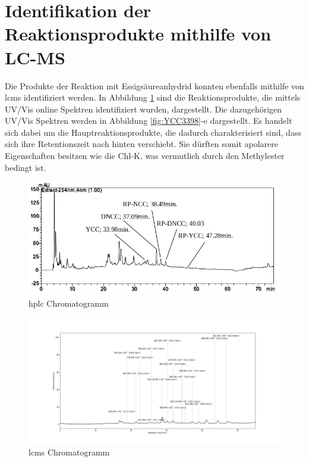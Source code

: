 \section{Identifikation der Reaktionsprodukte mithilfe von LC-MS}

Die Produkte der Reaktion mit Essigsäureanhydrid konnten ebenfalls mithilfe von \gls{lcms} identifiziert werden. In Abbildung \ref{fig:HPLCChromatogrammRP} sind die Reaktionsprodukte, die mittels UV/Vis online Spektren identifiziert wurden, dargestellt. Die dazugehörigen UV/Vis Spektren werden in Abbildung \ref{fig:YCC3398}-e dargestellt. Es handelt sich dabei um die Hauptreaktionsprodukte, die dadurch charakterisiert sind, dass sich ihre Retentionszeit nach hinten verschiebt. Sie dürften somit apolarere Eigenschaften besitzen wie die \gls{Chl-K}, was vermutlich durch den Methylester bedingt ist. 

\begin{figure}[!htbp]
  \includegraphics[width=\textwidth]{figures/Kapitel6/Reaktion3h/HPLC_Chromatogramm.png}
  \caption[HPLC Chromatogramm nach 3h Reaktionsdauer, Quelle: Author]{\gls{hplc} Chromatogramm}
  \label{fig:HPLCChromatogrammRP}
\end{figure}

\begin{figure}[!htbp]
  \includegraphics[width=\textwidth]{figures/Kapitel6/Reaktion3h/Kuerbis_Analyse_Reaktion3h_Ganzes_Spektrum.png}
  \caption[LC-MS Chromatogramm nach 3h Reaktionsdauer, Quelle: Author]{\gls{lcms} Chromatogramm}
  \label{fig:LCMSCChromatogrammRP}
\end{figure}

